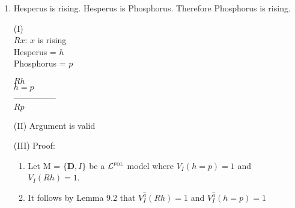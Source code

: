 \documentclass[12pt]{article}
\newcommand{\set}[1]{\lbrace#1\rbrace} %
\newcommand{\FOL}{\mathcal{L}^{\textsc{fol}}} %
\newcommand{\answer}[1]{%
  \par\noindent
  \begin{tcolorbox}[colback=gray!10, colframe=gray!80, title=Proof]
    #1
  \end{tcolorbox}
}
\begin{document}
\begin{enumerate}

  \item	Hesperus is rising. Hesperus is Phosphorus. Therefore Phosphorus is rising.
    \answer{
      \begin{flushleft}
        (I) \\
        $Rx$: $x$ is rising \\
        Hesperus = $h$ \\
        Phosphorus = $p$ \\
        
        \bigskip
        
        $Rh$ \\
        $h=p$ \\
        --------------- \\
        $Rp$
    \end{flushleft}
      (II) Argument is valid
      \bigskip
      
      (III) Proof:
      \begin{enumerate}[label=\arabic*.]
        \item Let M = $\set{\mathbf{D}, I}$ be a $\FOL$ model where $V_I(h=p) = 1$ and $V_I(Rh) = 1$.
        \item It follows by Lemma 9.2 that $V_I^{\hat{a}}(Rh) = 1$ and $V_I^{\hat{a}}(h=p) = 1$
      \end{enumerate}
        
}
\end{enumerate}
\end{document}
